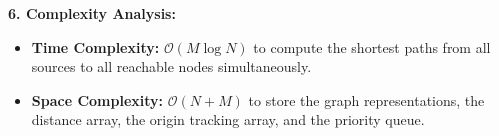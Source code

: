 \textbf{6. Complexity Analysis:}
\begin{itemize}
    \item \textbf{Time Complexity:} $\mathcal{O}(M \log N)$ to compute the shortest paths from all sources to all reachable nodes simultaneously.
    \item \textbf{Space Complexity:} $\mathcal{O}(N + M)$ to store the graph representations, the distance array, the origin tracking array, and the priority queue.
\end{itemize}